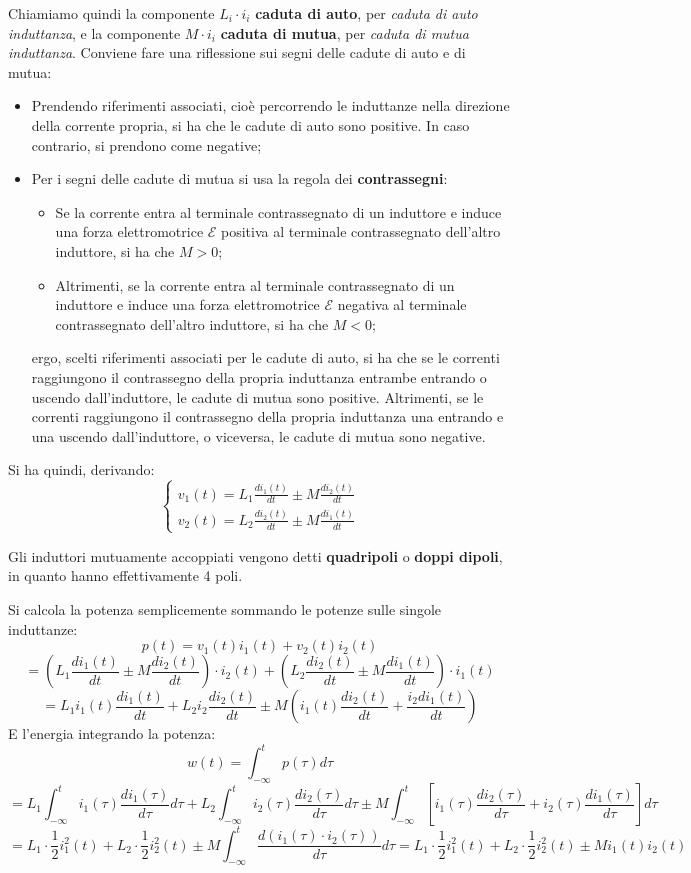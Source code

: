 \documentclass[a4paper,11pt]{article}
\begin{document}
Chiamiamo quindi la componente $L_i \cdot i_i$ \textbf{caduta di auto}, per \textit{caduta di auto induttanza}, e la componente $M \cdot i_i$ \textbf{caduta di mutua}, per \textit{caduta di mutua induttanza}.
Conviene fare una riflessione sui segni delle cadute di auto e di mutua: 
\begin{itemize}
	\item Prendendo riferimenti associati, cioè percorrendo le induttanze nella direzione della corrente propria, si ha che le cadute di auto sono positive. In caso contrario, si prendono come negative;
	\item Per i segni delle cadute di mutua si usa la regola dei \textbf{contrassegni}:
		\begin{itemize}
			\item Se la corrente entra al terminale contrassegnato di un induttore e induce una forza elettromotrice $\mathcal{E}$ positiva al terminale contrassegnato dell'altro induttore, si ha che $M>0$;
			\item Altrimenti, se la corrente entra al terminale contrassegnato di un induttore e induce una forza elettromotrice $\mathcal{E}$ negativa al terminale contrassegnato dell'altro induttore, si ha che $M<0$;
		\end{itemize}
	ergo, scelti riferimenti associati per le cadute di auto, si ha che se le correnti raggiungono il contrassegno della propria induttanza entrambe entrando o uscendo dall'induttore, le cadute di mutua sono positive.
	Altrimenti, se le correnti raggiungono il contrassegno della propria induttanza una entrando e una uscendo dall'induttore, o viceversa, le cadute di mutua sono negative.
\end{itemize}

Si ha quindi, derivando:
\[
	\begin{cases}
		v_1(t) = L_1 \frac{d i_1(t)}{dt} \pm M \frac{d i_2(t)}{dt} \\ 
		v_2(t) = L_2 \frac{d i_2(t)}{dt} \pm M \frac{d i_1(t)}{dt}
	\end{cases}
\]

Gli induttori mutuamente accoppiati vengono detti \textbf{quadripoli} o \textbf{doppi dipoli}, in quanto hanno effettivamente 4 poli.

Si calcola la potenza semplicemente sommando le potenze sulle singole induttanze:
$$
p(t) = v_1(t)i_1(t) + v_2(t)i_2(t)  
$$
$$
= \left( L_1 \frac{d i_1(t)}{dt} \pm M \frac{d i_2 (t)}{dt} \right) \cdot i_2(t) +  \left( L_2 \frac{d i_2(t)}{dt} \pm M \frac{d i_1 (t)}{dt} \right) \cdot i_1(t)
$$
$$
= L_1 i_1(t) \frac{d i_1(t)}{dt} + L_2 i_2 \frac{d i_2(t)}{dt} \pm M \left( i_1(t) \frac{d i_2(t)}{dt} + \frac{i_2 d i_1(t)}{dt} \right)
$$
E l'energia integrando la potenza:
$$
w(t) = \int_{-\infty}^t p(\tau) d\tau 
$$
$$
= L_1 \int_{-\infty}^t i_1(\tau) \frac{d i_1 (\tau)}{d\tau}d\tau + L_2 \int_{-\infty}^t i_2(\tau) \frac{d i_2 (\tau)}{d\tau}d\tau \pm M \int_{-\infty}^t \left[ i_1(\tau) \frac{d i_2(\tau)}{d \tau} + i_2(\tau) \frac{d i_1(\tau)}{d \tau} \right] d\tau
$$
$$
= L_1 \cdot \frac{1}{2} i_1^2(t) + L_2 \cdot \frac{1}{2} i_2^2(t) \pm M \int_{-\infty}^t \frac{d(i_1(\tau) \cdot i_2(\tau))}{d\tau}d\tau = L_1 \cdot \frac{1}{2} i_1^2(t) + L_2 \cdot \frac{1}{2} i_2^2(t) \pm M i_1(t)i_2(t) 
$$
\end{document}
